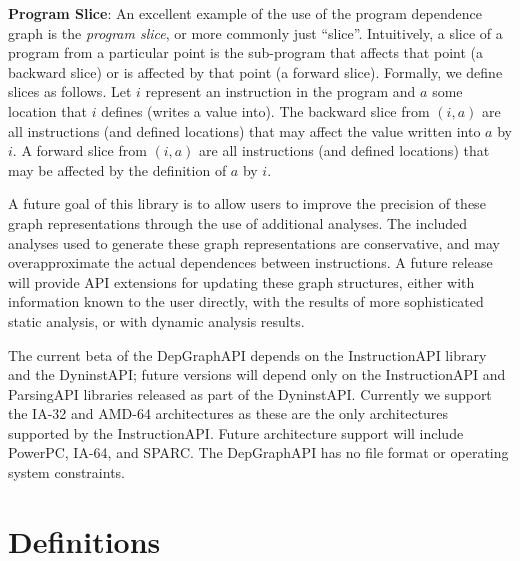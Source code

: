 \documentclass[12pt,titlepage]{article}
\begin{document}
\textbf{Program Slice}: An excellent example of the use of the program
dependence graph is the \emph{program slice}, or more commonly just
``slice''. Intuitively, a slice of a program from a particular point
is the sub-program that affects that point (a backward slice) or is
affected by that point (a forward slice). Formally, we define slices
as follows. Let $i$ represent an instruction in the program and $a$
some location that $i$ defines (writes a value into).  The backward
slice from $(i,a)$ are all instructions (and defined locations) that
may affect the value written into $a$ by $i$.  A forward slice from
$(i,a)$ are all instructions (and defined locations) that may be
affected by the definition of $a$ by $i$.

A future goal of this library is to allow users to improve the
precision of these graph representations through the use of additional
analyses. The included analyses used to generate these graph
representations are conservative, and may overapproximate the actual
dependences between instructions. A future release will provide API
extensions for updating these graph structures, either with
information known to the user directly, with the results of more
sophisticated static analysis, or with dynamic analysis results.

The current beta of the DepGraphAPI depends on the InstructionAPI
library and the DyninstAPI; future versions will depend only on the
InstructionAPI and ParsingAPI libraries released as part of the
DyninstAPI. Currently we support the IA-32 and AMD-64 architectures as
these are the only architectures supported by the
InstructionAPI. Future architecture support will include PowerPC, IA-64,
and SPARC. The DepGraphAPI has no file format or operating system
constraints.

\section{Definitions}
\end{document}
